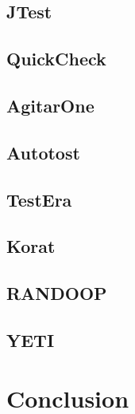 \subsection{JTest}
\subsection{QuickCheck}
\subsection{AgitarOne}
\subsection{Autotost}
\subsection{TestEra}
\subsection{Korat}
\subsection{RANDOOP}
\subsection{YETI}


\section{Conclusion}


